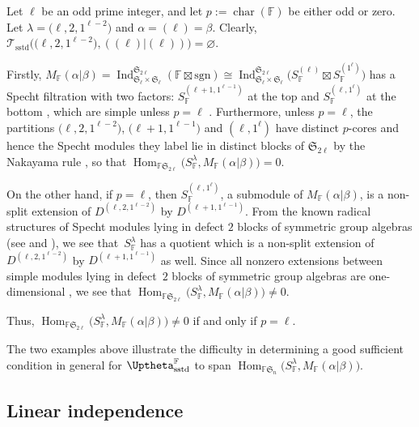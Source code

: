 \documentclass[pdftex]{sigma}
\newcommand{\TTS}{\mathscr{T}_\mathrm{sstd}}
\newcommand{\sgn}{\mathrm{sgn}}
\newcommand{\Char}{\operatorname{\mathrm{char}}}
\newcommand{\Hom}{\operatorname{Hom}}
\newcommand{\sym}[1]{\mathfrak{S}_{#1}}
\newcommand{\Ind}{\operatorname{\mathrm{Ind}}}
\newcommand{\F}{\mathbb{F}}
\newcommand{\JHOM}{\Uptheta}
\newcommand{\hJHOM}{{\JHOM}}
\begin{document}
\begin{Example}\label{Eg: hom char}
Let $\ell$ be an odd prime integer, and let $p:=\Char(\F)$ be either odd or zero.
Let $\lambda = \big(\ell,2,1^{\ell-2}\big)$ and $\alpha = (\ell) = \beta$. Clearly, $\TTS\big(\big(\ell,2,1^{\ell-2}\big),((\ell)|(\ell))\big)=\varnothing$.

Firstly, $M_\F(\alpha|\beta) = \Ind^{\sym{2\ell}}_{\sym{\ell} \times \sym{\ell}} (\F \boxtimes \sgn) \cong \Ind^{\sym{2\ell}}_{\sym{\ell} \times \sym{\ell}} \big(S_\F^{(\ell)} \boxtimes S_\F^{(1^\ell)}\big)$ has a Specht filtration with two factors: $S_\F^{(\ell+1,1^{\ell-1})}$ at the top and $S_\F^{(\ell,1^\ell)}$ at the bottom \cite{JP}, which are simple unless $p = \ell$ \cite[Theorem~2]{P}.
Furthermore, unless $p = \ell$, the partitions $\big(\ell,2,1^{\ell-2}\big)$, $\big(\ell+1,1^{\ell-1}\big)$ and $(\ell,1^\ell)$ have distinct $p$-cores and hence the Specht modules they label lie in distinct blocks of $\sym{2\ell}$ by the Nakayama rule \cite[Corollary~6.1.42]{GJAK}, so that $\Hom_{\F\sym{2\ell}}\big(S_\F^\lambda,M_\F(\alpha|\beta)\big) =0$.

On the other hand, if $p = \ell$, then $S_\F^{(\ell,1^\ell)}$, a submodule of $M_\F(\alpha|\beta)$, is a non-split extension of $D^{(\ell,2,1^{\ell-2})}$ by $D^{(\ell+1,1^{\ell-1})}$. From the known radical structures of Specht modules lying in defect $2$ blocks of symmetric group algebras (see \cite[Theorem~4.4]{R} and \cite[Proposition~6.2]{CT}), we see that~$S_\F^{\lambda}$ has a quotient which is a non-split extension of $D^{(\ell,2,1^{\ell-2})}$ by $D^{(\ell+1,1^{\ell-1})}$ as well. Since all nonzero extensions between simple modules lying in defect~$2$ blocks of symmetric group algebras are one-dimensional \cite[Theorem~I(5)]{S}, we see that $\Hom_{\F\sym{2\ell}}\big(S_\F^\lambda,M_\F(\alpha|\beta)\big) \ne 0$.

Thus, $\Hom_{\F\sym{2\ell}}\big(S_\F^\lambda,M_\F(\alpha|\beta)\big) \ne 0$ if and only if $p = \ell$.
\end{Example}

The two examples above illustrate the difficulty in determining a good sufficient condition in general for $\hJHOM^{\F}_{\mathrm{sstd}}$ to span $\Hom_{\F\sym{n}}\big(S_\F^\lambda,M_\F(\alpha|\beta)\big)$.

\subsection{Linear independence}
\end{document}
